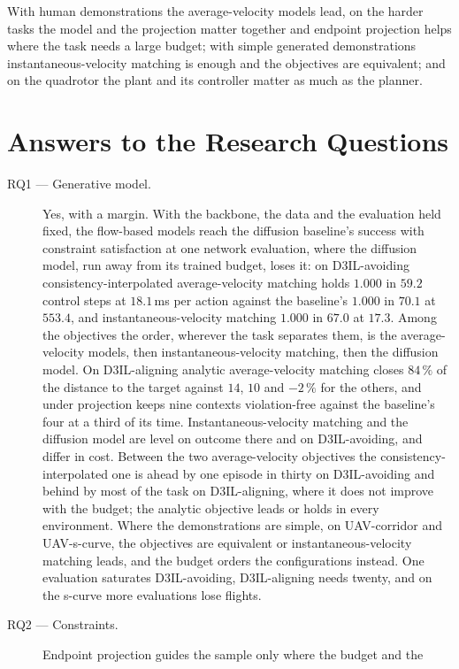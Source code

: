 With human demonstrations the average-velocity models lead, on the harder tasks the
model and the projection matter together and endpoint projection helps where the task needs a large
budget; with simple generated demonstrations instantaneous-velocity matching is enough and the
objectives are equivalent; and on the quadrotor the plant and its controller matter as much as the
planner.

\section{Answers to the Research Questions}\label{sec:conc:rqs}

\begin{description}
  \item[RQ1 --- Generative model.] Yes, with a margin. With the backbone, the data and the evaluation
    held fixed, the flow-based models reach the diffusion baseline's success with constraint
    satisfaction at one network evaluation, where the diffusion model, run away from its trained
    budget, loses it: on D3IL-avoiding consistency-interpolated average-velocity matching holds
    $1.000$ in $59.2$ control steps at $18.1$\,ms per action against the baseline's $1.000$ in $70.1$
    at $553.4$, and instantaneous-velocity matching $1.000$ in $67.0$ at $17.3$. Among the objectives
    the order, wherever the task separates them, is the average-velocity models, then
    instantaneous-velocity matching, then the diffusion model. On D3IL-aligning analytic
    average-velocity matching closes $84\,\%$ of the distance to the target against $14$, $10$ and
    $-2\,\%$ for the others, and under projection keeps nine contexts violation-free against the
    baseline's four at a third of its time. Instantaneous-velocity matching and the diffusion model
    are level on outcome there and on D3IL-avoiding, and differ in cost. Between the two
    average-velocity objectives the consistency-interpolated one is ahead by one episode in thirty on
    D3IL-avoiding and behind by most of the task on D3IL-aligning, where it does not improve with
    the budget; the analytic objective leads or holds in every environment. Where the demonstrations
    are simple, on UAV-corridor and UAV-s-curve, the objectives are equivalent or
    instantaneous-velocity matching leads, and the budget orders the configurations instead. One
    evaluation saturates D3IL-avoiding, D3IL-aligning needs twenty, and on the s-curve more
    evaluations lose flights.
  \item[RQ2 --- Constraints.] Endpoint projection guides the sample only where the budget and the

\end{description}
